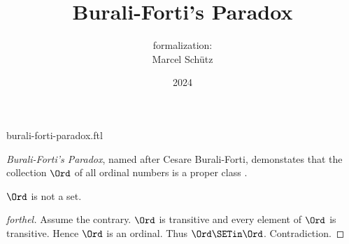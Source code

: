 \documentclass{article}
\title{Burali-Forti's Paradox}
\author{\Naproche formalization:\\[0.5em]Marcel Schütz}
\date{2024}
\begin{document}
\begin{smodule}{burali-forti-paradox.ftl}
\maketitle


\noindent \emph{Burali-Forti's Paradox}, named after Cesare Burali-Forti, 
demonstates that the collection $\Ord$ of all ordinal numbers is a
proper class \cite{BuraliForti1897}.

\begin{theorem}[forthel,title=Burali-Forti's Paradox,id=burali_forti_paradox]
  $\Ord$ is not a set.
\end{theorem}
\begin{proof}[forthel]
  Assume the contrary.
  $\Ord$ is transitive and every element of $\Ord$ is transitive.
  Hence $\Ord$ is an ordinal.
  Thus $\Ord \SETin \Ord$.
  Contradiction.
\end{proof}

\printbibliography
{}
\end{smodule}
\end{document}
